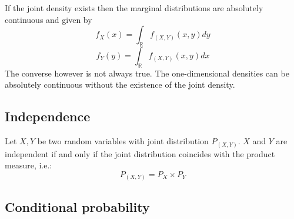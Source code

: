     \begin{result}
		If the joint density exists then the marginal distributions are absolutely continuous and given by
        \begin{equation}
			f_X(x) = \int_{\mathbb{R}}f_{(X, Y)}(x, y)dy
		\end{equation}
        \begin{equation}
			f_Y(y) = \int_{\mathbb{R}}f_{(X, Y)}(x, y)dx
		\end{equation}
        The converse however is not always true. The one-dimensional densities can be absolutely continuous without the existence of the joint density.
	\end{result}
    
\subsection{Independence}
    
    \begin{theorem}
		Let $X, Y$ be two random variables with joint distribution $P_{(X, Y)}$. $X$ and $Y$ are independent if and only if the joint distribution coincides with the product measure, i.e.:
        \[
        	P_{(X, Y)} = P_X\times P_Y
        \]
	\end{theorem}
    
    
\subsection{Conditional probability}

